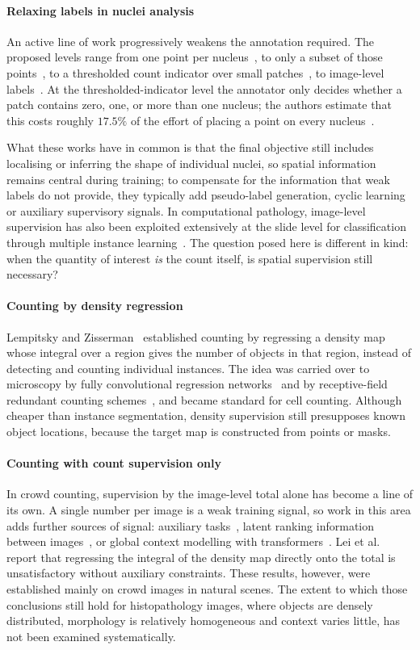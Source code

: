 \documentclass[preprint,12pt]{elsarticle}
\begin{document}
\paragraph{Relaxing labels in nuclei analysis} An active line of work progressively weakens the annotation
required. The proposed levels range from one point per nucleus~\cite{pseudoedgenet}, to only a subset of those
points~\cite{qu2020}, to a thresholded count indicator over small patches~\cite{lirnet}, to image-level
labels~\cite{cyclic}. At the thresholded-indicator level the annotator only decides whether a patch contains
zero, one, or more than one nucleus; the authors estimate that this costs roughly $17.5\%$ of the effort of
placing a point on every nucleus~\cite{lirnet}.

What these works have in common is that the final objective still includes localising or inferring the shape of
individual nuclei, so spatial information remains central during training; to compensate for the information
that weak labels do not provide, they typically add pseudo-label generation, cyclic learning or auxiliary
supervisory signals. In computational pathology, image-level supervision has also been exploited extensively at
the slide level for classification through multiple instance learning~\cite{campanella}. The question posed
here is different in kind: when the quantity of interest \emph{is} the count itself, is spatial supervision
still necessary?

\paragraph{Counting by density regression} Lempitsky and Zisserman~\cite{lempitsky} established counting by
regressing a density map whose integral over a region gives the number of objects in that region, instead of
detecting and counting individual instances. The idea was carried over to microscopy by fully convolutional
regression networks~\cite{fcrn} and by receptive-field redundant counting schemes~\cite{countception}, and
became standard for cell counting. Although cheaper than instance segmentation, density supervision still
presupposes known object locations, because the target map is constructed from points or masks.

\paragraph{Counting with count supervision only} In crowd counting, supervision by the image-level total alone
has become a line of its own. A single number per image is a weak training signal, so work in this area adds
further sources of signal: auxiliary tasks~\cite{matt}, latent ranking information between
images~\cite{sorting}, or global context modelling with transformers~\cite{transcrowd}. Lei et
al.~\cite{matt} report that regressing the integral of the density map directly onto the total is unsatisfactory
without auxiliary constraints. These results, however, were established mainly on crowd images in natural
scenes. The extent to which those conclusions still hold for histopathology images, where objects are densely
distributed, morphology is relatively homogeneous and context varies little, has not been examined
systematically.
\end{document}
